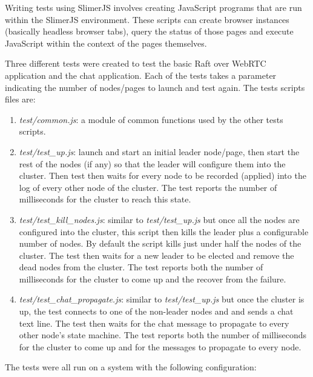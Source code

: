 \documentclass[9pt]{extarticle}
\begin{document}
\begin{multicols}{2}
Writing tests using SlimerJS involves creating JavaScript programs
that are run within the SlimerJS environment. These scripts can create
browser instances (basically headless browser tabs), query the status
of those pages and execute JavaScript within the context of the pages
themselves.

Three different tests were created to test the basic Raft over WebRTC
application and the chat application. Each of the tests takes
a parameter indicating the number of nodes/pages to launch and test
again. The tests scripts files are:

\begin{enumerate}
    \item \emph{test/common.js}: a module of common functions used by
        the other tests scripts.
    \item \emph{test/test\_up.js}: launch and start an initial leader
        node/page, then start the rest of the nodes (if any) so that
        the leader will configure them into the cluster. Then test
        then waits for every node to be recorded (applied) into the log
        of every other node of the cluster. The test reports the
        number of milliseconds for the cluster to reach this state.
    \item \emph{test/test\_kill\_nodes.js}: similar to
        \emph{test/test\_up.js} but once all the nodes are configured
        into the cluster, this script then kills the leader plus
        a configurable number of nodes. By default the script kills
        just under half the nodes of the cluster. The test then waits
        for a new leader to be elected and remove the dead nodes from
        the cluster. The test reports both the number of milliseconds
        for the cluster to come up and the recover from the failure.
    \item \emph{test/test\_chat\_propagate.js}: similar to
        \emph{test/test\_up.js} but once the cluster is up, the test
        connects to one of the non-leader nodes and and sends a chat
        text line. The test then waits for the chat message to
        propagate to every other node's state machine. The test
        reports both the number of milliseconds for the cluster to
        come up and for the messages to propagate to every node.
\end{enumerate}

The tests were all run on a system with the following configuration:


\end{multicols}
\end{document}
